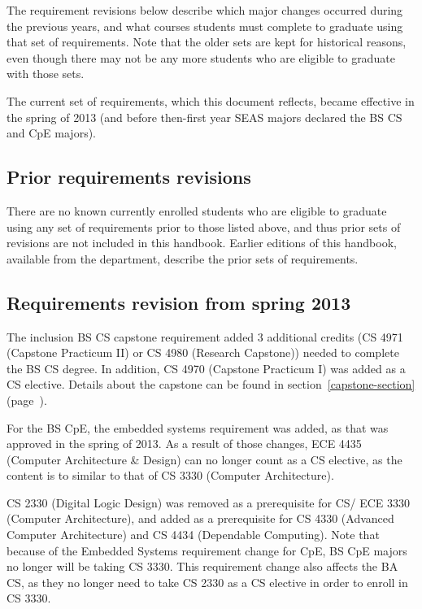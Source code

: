 The requirement revisions below describe which major changes occurred
during the previous years, and what courses students must complete to
graduate using that set of requirements. Note that the older sets are
kept for historical reasons, even though there may not be any more
students who are eligible to graduate with those sets.

The current set of requirements, which this document reflects, became
effective in the spring of 2013 (and before then-first year SEAS
majors declared the BS CS and CpE majors).

\subsection{Prior requirements revisions}

There are no known currently enrolled students who are eligible to graduate
using any set of requirements prior to those listed above, and thus
prior sets of revisions are not included in this handbook.  Earlier
editions of this handbook, available from the department, describe
the prior sets of requirements.

\iffalse

\subsection{Requirements revision from spring 2013}

The inclusion BS CS capstone requirement added 3 additional credits
(CS 4971 (Capstone Practicum II) or CS 4980 (Research Capstone))
needed to complete the BS CS degree.  In addition, CS 4970 (Capstone
Practicum I) was added as a CS elective.  Details about the capstone
can be found in section~\ref{capstone-section}
(page~\pageref{capstone-section}).

For the BS CpE, the embedded systems requirement was added, as that
was approved in the spring of 2013.  As a result of those changes, ECE
4435 (Computer Architecture \& Design) can no longer count as a CS
elective, as the content is to similar to that of CS 3330 (Computer
Architecture).

CS 2330 (Digital Logic Design) was removed as a prerequisite for
CS/ ECE 3330 (Computer Architecture), and added as a prerequisite for
CS 4330 (Advanced Computer Architecture) and CS 4434 (Dependable
Computing).  Note that because of the Embedded Systems requirement
change for CpE, BS CpE majors no longer will be taking CS 3330.
This requirement change also affects the BA CS, as they no longer need
to take CS 2330 as a CS elective in order to enroll in CS 3330.

